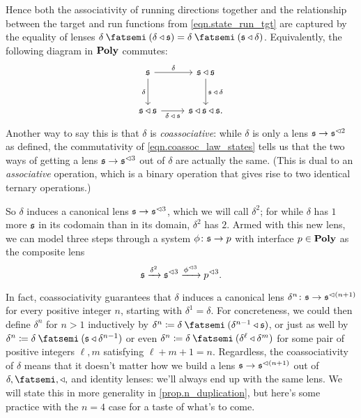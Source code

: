 \documentclass[Book-Poly]{subfiles}
\begin{document}
Hence both the associativity of running directions together and the relationship between the target and run functions from \eqref{eqn.state_run_tgt} are captured by the equality of lenses $\delta\then(\delta\tri\ema{s})=\delta\then(\ema{s}\tri\delta)$.
Equivalently, the following diagram in $\mathbf{Poly}$ commutes:
\begin{equation}\label{eqn.coassoc_law_states}
\begin{tikzcd}[row sep=large]
	\ema{s}\ar[r, "\delta"]\ar[d, "\delta"']&
	\ema{s}\tri\ema{s}\ar[d, "\ema{s}\:\tri\:\delta"]\\
	\ema{s}\tri\ema{s}\ar[r, "\delta\:\tri\:\ema{s}"']&
	\ema{s}\tri\ema{s}\tri\ema{s}.
\end{tikzcd}
\end{equation}
Another way to say this is that $\delta$ is \emph{coassociative}: while $\delta$ is only a lens $\mathfrak{s}\to\mathfrak{s}^{\lhd 2}$ as defined, the commutativity of \eqref{eqn.coassoc_law_states} tells us that the two ways of getting a lens $\mathfrak{s}\to\mathfrak{s}^{\lhd 3}$ out of $\delta$ are actually the same.
(This is dual to an \emph{associative} operation, which is a binary operation that gives rise to two identical ternary operations.)

So $\delta$ induces a canonical lens $\mathfrak{s}\to\mathfrak{s}^{\lhd 3}$, which we will call $\delta^2$; for while $\delta$ has $1$ more $\mathfrak{s}$ in its codomain than in its domain, $\delta^2$ has $2$.
Armed with this new lens, we can model three steps through a system $\phi\colon\mathfrak{s}\to p$ with interface $p\in\mathbf{Poly}$ as the composite lens
\[
    \mathfrak{s}\xrightarrow{\delta^2}\mathfrak{s}^{\lhd 3}\xrightarrow{\phi^{\lhd 3}}p^{\lhd 3}.
\]

In fact, coassociativity guarantees that $\delta$ induces a canonical lens $\delta^n\colon\mathfrak{s}\to\mathfrak{s}^{\lhd (n+1)}$ for every positive integer $n$, starting with $\delta^1=\delta$.
For concreteness, we could then define $\delta^n$ for $n>1$ inductively by $\delta^n\coloneqq\delta\then(\delta^{n-1}\tri\ema{s})$, or just as well by $\delta^n\coloneqq\delta\then(\ema{s}\tri\delta^{n-1})$ or even $\delta^n\coloneqq\delta\then(\delta^\ell\tri\delta^m)$ for some pair of positive integers $\ell,m$ satisfying $\ell+m+1=n$.
Regardless, the coassociativity of $\delta$ means that it doesn't matter how we build a lens $\mathfrak{s}\to\mathfrak{s}^{\lhd (n+1)}$ out of $\delta,\then,\tri,$ and identity lenses: we'll always end up with the same lens.
We will state this in more generality in \cref{prop.n_duplication}, but here's some practice with the $n=4$ case for a taste of what's to come. %
\end{document}
